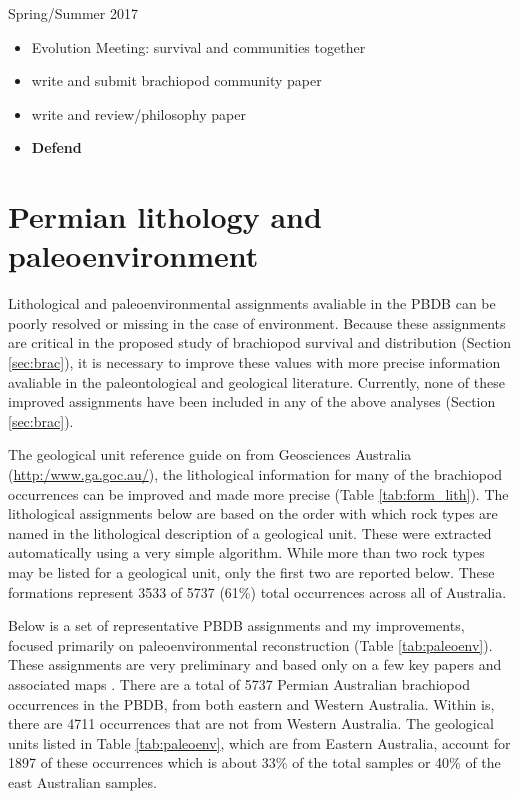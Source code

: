 \documentclass[12pt,letterpaper]{article}
\begin{document}
Spring/Summer 2017
\begin{itemize}
  \item Evolution Meeting: survival and communities together
  \item write and submit brachiopod community paper
  \item write and review/philosophy paper
  \item \textbf{Defend}
\end{itemize}


\clearpage




\clearpage


\appendix

\section{Permian lithology and paleoenvironment} \label{sec:env_app}
Lithological and paleoenvironmental assignments avaliable in the PBDB can be poorly resolved or missing in the case of environment. Because these assignments are critical in the proposed study of brachiopod survival and distribution (Section \ref{sec:brac}), it is necessary to improve these values with more precise information avaliable in the paleontological and geological literature. Currently, none of these improved assignments have been included in any of the above analyses (Section \ref{sec:brac}).

The geological unit reference guide on from Geosciences Australia (\url{http:/www.ga.goc.au/}), the lithological information for many of the brachiopod occurrences can be improved and made more precise (Table \ref{tab:form_lith}). The lithological assignments below are based on the order with which rock types are named in the lithological description of a geological unit. These were extracted automatically using a very simple algorithm. While more than two rock types may be listed for a geological unit, only the first two are reported below. These formations represent 3533 of 5737 (61\%) total occurrences across all of Australia.


Below is a set of representative PBDB assignments and my improvements, focused primarily on paleoenvironmental reconstruction (Table \ref{tab:paleoenv}). These assignments are very preliminary and based only on a few key papers and associated maps \citep{Percival2012,Fielding2006,Hawley1995,Fielding1993,Othman2002,Othman2003}. There are a total of 5737 Permian Australian brachiopod occurrences in the PBDB, from both eastern and Western Australia. Within is, there are 4711 occurrences that are not from Western Australia. The geological units listed in Table \ref{tab:paleoenv}, which are from Eastern Australia, account for 1897 of these occurrences which is about 33\% of the total samples or 40\% of the east Australian samples.

\end{document}
